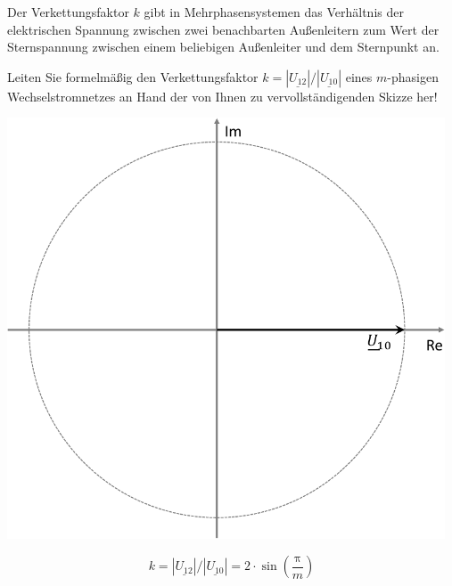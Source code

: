 \aufgabe[6]
Der Verkettungsfaktor $k$ gibt in Mehrphasensystemen das Verhältnis der elektrischen Spannung zwischen zwei benachbarten Außenleitern zum Wert der Sternspannung zwischen einem beliebigen Außenleiter und dem Sternpunkt an.

Leiten Sie formelmäßig den Verkettungsfaktor $k = |\underline{U_{12}}|/|\underline{U_{10}}|$ eines $m$-phasigen Wechselstromnetzes an Hand der von Ihnen zu vervollständigenden Skizze her!

\vskip 12pt
\begin{center}
	\includegraphics[width=13cm]{aufgabe_xyz/aufgabe4-crop}
\end{center}

\begin{solution}[15cm]
	\begin{center}
		\[ k = |\underline{U_{12}}|/|\underline{U_{10}}| = 2 \cdot \sin \left(\frac{\mathrm{\pi}}{m} \right)\]
	\end{center}
\end{solution}

\newpage